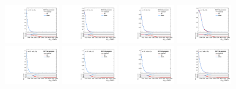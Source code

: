 \begin{figure}[htbp]
  \centering
  \includegraphics[width=0.21\textwidth]{fig/uncertainties/systs_res_e_HP_bb_LDy_MVVTail_ProjX.pdf}
  \includegraphics[width=0.21\textwidth]{fig/uncertainties/systs_res_e_LP_bb_LDy_MVVTail_ProjX.pdf}
  \includegraphics[width=0.21\textwidth]{fig/uncertainties/systs_res_e_HP_bb_HDy_MVVTail_ProjX.pdf}
  \includegraphics[width=0.21\textwidth]{fig/uncertainties/systs_res_e_LP_bb_HDy_MVVTail_ProjX.pdf}\\
  \includegraphics[width=0.21\textwidth]{fig/uncertainties/systs_res_e_HP_nobb_LDy_MVVTail_ProjX.pdf}
  \includegraphics[width=0.21\textwidth]{fig/uncertainties/systs_res_e_LP_nobb_LDy_MVVTail_ProjX.pdf}
  \includegraphics[width=0.21\textwidth]{fig/uncertainties/systs_res_e_HP_nobb_HDy_MVVTail_ProjX.pdf}
  \includegraphics[width=0.21\textwidth]{fig/uncertainties/systs_res_e_LP_nobb_HDy_MVVTail_ProjX.pdf}\\

\end{figure}
